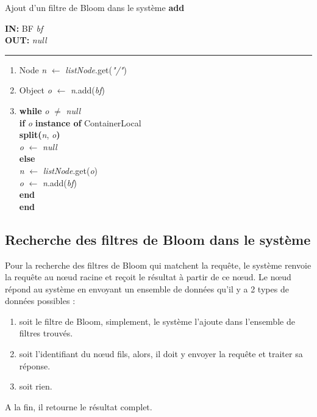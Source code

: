 \documentclass[a4paper,11pt]{report}
\begin{document}
\begin{algorithme}
	Ajout d'un filtre de Bloom dans le système \textbf{add}
\end{algorithme}

\begin{flushleft}
	\begin{framed}
		\textbf{IN:} BF \textit{bf} \\
		\textbf{OUT:} \textit{null}\\
		\noindent\rule{\linewidth}{0.5pt}

		\begin{enumerate}
			\item Node \textit{n} $\leftarrow$ \textit{listNode}.get(\textit{"/"})
			\item Object \textit{o} $\leftarrow$ \textit{n}.add(\textit{bf})
			\item
				\begin{tabbing}
					\textbf{wh}\=\textbf{ile }\=\textit{o} $\neq$ \textit{null}\\
						\> \textbf{if }\= \textit{o} \textbf{instance of} ContainerLocal\\
						\> \> \textbf{split(}\textit{n}, \textit{o}\textbf{)}\\
						\> \> \textit{o} $\leftarrow$ \textit{null}\\
						\> \textbf{else}\\
						\> \> \textit{n} $\leftarrow$ \textit{listNode}.get(\textit{o})\\
						\> \> \textit{o} $\leftarrow$ \textit{n}.add(\textit{bf})\\
						\> \textbf{end}\\
					\textbf{end}
				\end{tabbing}									
		\end{enumerate}	
	\end{framed}
\end{flushleft}
	
\subsection{Recherche des filtres de Bloom dans le système}
	Pour la recherche des filtres de Bloom qui matchent la requête, le système renvoie la requête au nœud racine et reçoit le résultat à partir de ce nœud. Le nœud répond au système en envoyant un ensemble de données qu'il y a 2 types de données possibles : 
	\begin{enumerate}
		\item soit le filtre de Bloom, simplement, le système l'ajoute dans l'ensemble de filtres trouvés.
		\item soit l'identifiant du nœud fils, alors, il doit y envoyer la requête et traiter sa réponse.
		\item soit rien.
	\end{enumerate}
	A la fin, il retourne le résultat complet.
\end{document}
